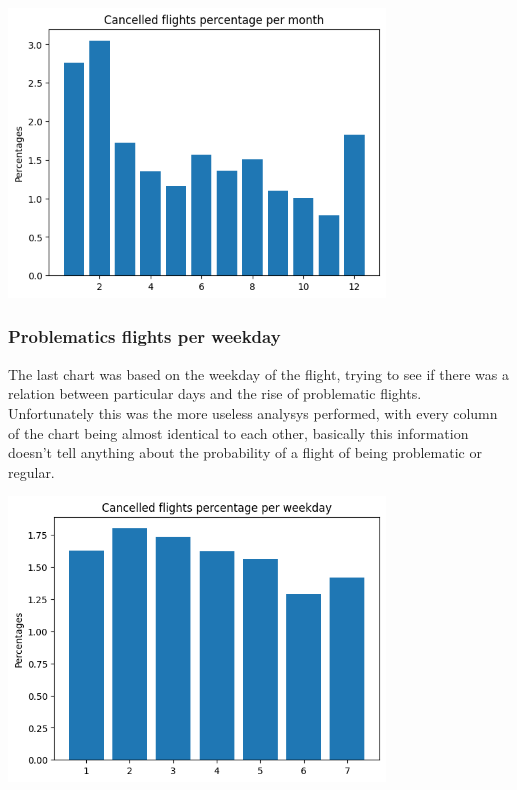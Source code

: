 \documentclass[
	letterpaper, %
	10pt, %
]{class}
\begin{document}
\begin{center}
    \includegraphics[width=10cm]{../images/cancelled_per_month.png}
\end{center}

\subsubsection{Problematics flights per weekday}

The last chart was based on the weekday of the flight, trying to see if there was a relation between particular days and the rise of problematic flights.\\

Unfortunately this was the more useless analysys performed, with every column of the chart being almost identical to each other, basically this information doesn't tell anything about the probability of a flight of being problematic or regular.

\begin{center}
    \includegraphics[width=10cm]{../images/cancelled_per_weekday.png}
\end{center}
\end{document}
